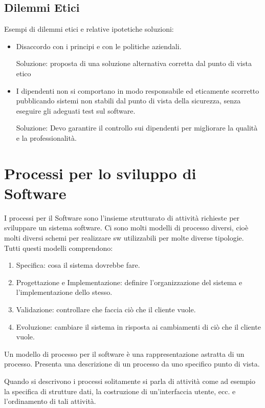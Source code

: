 \documentclass[a4paper, 10pt]{article}
\begin{document}
		\subsection{Dilemmi Etici}
			Esempi di dilemmi etici e relative ipotetiche soluzioni:
			\begin{itemize}
				\item Disaccordo con i principi e con le politiche aziendali.
				
				Soluzione: proposta di una soluzione alternativa corretta dal punto di vista etico
				
				\item I dipendenti non si comportano in modo responsabile ed eticamente scorretto pubblicando sistemi non stabili dal punto di vista della sicurezza, senza eseguire gli adeguati test sul software.
				
				Soluzione: Devo garantire il controllo sui dipendenti per migliorare la qualità e la professionalità.
			\end{itemize}
			
	\section{Processi per lo sviluppo di Software}
		I processi per il Software sono l'insieme strutturato di attività richieste per sviluppare un sistema software. Ci sono molti modelli di processo diversi, cioè molti diversi schemi per realizzare sw utilizzabili per molte diverse tipologie. Tutti questi modelli comprendono:
			\begin{enumerate}
				\item Specifica: cosa il sistema dovrebbe fare.
				\item Progettazione e Implementazione: definire l'organizzazione del sistema e l'implementazione dello stesso.
				\item Validazione: controllare che faccia ciò che il cliente vuole.
				\item Evoluzione: cambiare il sistema in risposta ai cambiamenti di ciò che il cliente vuole.
			\end{enumerate}
	Un modello di processo per il software è una rappresentazione astratta di un processo. Presenta una descrizione di un processo da uno specifico punto di vista.
	
	\noindent
	Quando si descrivono i processi solitamente si parla di attività come ad esempio la specifica di strutture dati, la costruzione di un'interfaccia utente, ecc. e l'ordinamento di tali attività.
	
\end{document}
